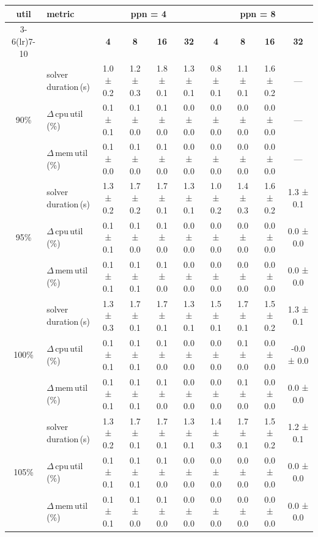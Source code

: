 \begin{tabular}{@{}c l *{8}{c}@{}}
\toprule
\multirow{2}{*}{\textbf{util}} & \multirow{2}{*}{\textbf{metric}} &\multicolumn{4}{c}{\textbf{ppn = 4}} & \multicolumn{4}{c}{\textbf{ppn = 8}}\\
\cmidrule(lr){3-6}\cmidrule(lr){7-10}
 &  & \textbf{4} & \textbf{8} & \textbf{16} & \textbf{32} & \textbf{4} & \textbf{8} & \textbf{16} & \textbf{32}\\
\midrule
\multirow{3}{*}{90\%}
& solver\,duration\,(s) & 1.0 ± 0.2 & 1.2 ± 0.3 & 1.8 ± 0.1 & 1.3 ± 0.1 & 0.8 ± 0.1 & 1.1 ± 0.1 & 1.6 ± 0.2 & \multicolumn{1}{c}{—} \\
& $\Delta$\,cpu\,util\,(\%) & 0.1 ± 0.1 & 0.1 ± 0.0 & 0.1 ± 0.0 & 0.0 ± 0.0 & 0.0 ± 0.0 & 0.0 ± 0.0 & 0.0 ± 0.0 & \multicolumn{1}{c}{—} \\
& $\Delta$\,mem\,util\,(\%) & 0.1 ± 0.0 & 0.1 ± 0.0 & 0.1 ± 0.0 & 0.0 ± 0.0 & 0.0 ± 0.0 & 0.0 ± 0.0 & 0.0 ± 0.0 & \multicolumn{1}{c}{—} \\
\midrule
\multirow{3}{*}{95\%}
& solver\,duration\,(s) & 1.3 ± 0.2 & 1.7 ± 0.2 & 1.7 ± 0.1 & 1.3 ± 0.1 & 1.0 ± 0.2 & 1.4 ± 0.3 & 1.6 ± 0.2 & 1.3 ± 0.1 \\
& $\Delta$\,cpu\,util\,(\%) & 0.1 ± 0.1 & 0.1 ± 0.0 & 0.1 ± 0.0 & 0.0 ± 0.0 & 0.0 ± 0.0 & 0.0 ± 0.0 & 0.0 ± 0.0 & 0.0 ± 0.0 \\
& $\Delta$\,mem\,util\,(\%) & 0.1 ± 0.1 & 0.1 ± 0.1 & 0.1 ± 0.0 & 0.0 ± 0.0 & 0.0 ± 0.0 & 0.0 ± 0.0 & 0.0 ± 0.0 & 0.0 ± 0.0 \\
\midrule
\multirow{3}{*}{100\%}
& solver\,duration\,(s) & 1.3 ± 0.3 & 1.7 ± 0.1 & 1.7 ± 0.1 & 1.3 ± 0.1 & 1.5 ± 0.1 & 1.7 ± 0.1 & 1.5 ± 0.2 & 1.3 ± 0.1 \\
& $\Delta$\,cpu\,util\,(\%) & 0.1 ± 0.1 & 0.1 ± 0.1 & 0.1 ± 0.0 & 0.0 ± 0.0 & 0.0 ± 0.0 & 0.1 ± 0.0 & 0.0 ± 0.0 & -0.0 ± 0.0 \\
& $\Delta$\,mem\,util\,(\%) & 0.1 ± 0.1 & 0.1 ± 0.1 & 0.1 ± 0.0 & 0.0 ± 0.0 & 0.0 ± 0.0 & 0.1 ± 0.0 & 0.0 ± 0.0 & 0.0 ± 0.0 \\
\midrule
\multirow{3}{*}{105\%}
& solver\,duration\,(s) & 1.3 ± 0.2 & 1.7 ± 0.1 & 1.7 ± 0.1 & 1.3 ± 0.1 & 1.4 ± 0.3 & 1.7 ± 0.1 & 1.5 ± 0.2 & 1.2 ± 0.1 \\
& $\Delta$\,cpu\,util\,(\%) & 0.1 ± 0.1 & 0.1 ± 0.1 & 0.1 ± 0.0 & 0.0 ± 0.0 & 0.0 ± 0.0 & 0.0 ± 0.0 & 0.0 ± 0.0 & 0.0 ± 0.0 \\
& $\Delta$\,mem\,util\,(\%) & 0.1 ± 0.1 & 0.1 ± 0.0 & 0.1 ± 0.0 & 0.0 ± 0.0 & 0.0 ± 0.0 & 0.0 ± 0.0 & 0.0 ± 0.0 & 0.0 ± 0.0 \\
\bottomrule
\end{tabular}
